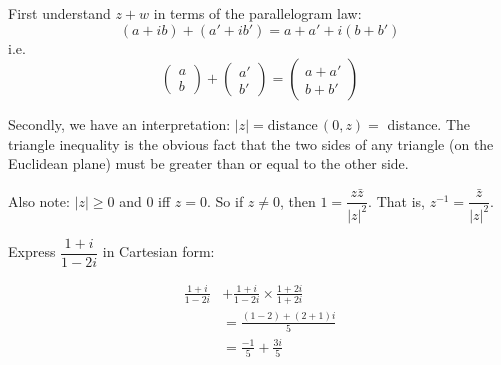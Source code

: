 \documentclass[twoside]{scrartcl}
\begin{document}
 First understand $z + w$ in terms of the parallelogram law: 
\[(a+ ib) + (a' + ib') = a + a' + i(b + b')\]
i.e. 
\[\begin{pmatrix}
a \\ b	
\end{pmatrix}
+ \begin{pmatrix}
 a' \\ b'	
 \end{pmatrix}
= \begin{pmatrix}
 a + a'\\ b + b'	
 \end{pmatrix}
\]


\begin{center}
\end{center}

Secondly, we have an interpretation: $|z| = \text{distance}\,(0,z) = $ distance. The triangle inequality is the obvious fact that the two sides of any triangle (on the Euclidean plane) must be greater than or equal to the other side. 

Also note: $|z| \geq 0$ and $0$ iff $z = 0$. So if $z \neq 0$, then $1 = \dfrac{z\bar{z}}{|z|^2}$. That is, $z^{-1} = \dfrac{\bar{z}}{|z|^2}$.\\ 


\begin{example}
	Express $\dfrac{1 +i}{1 - 2i}$ in Cartesian form:
	
	\[
\begin{aligned}
  \frac{1+i}{1-2i} &+ \frac{1 +i}{1 - 2i} \times \frac{1 + 2i}{1 + 2i}\\
  &= \frac{(1-2) + (2 + 1)i}{5}\\[0.2cm]
  &= \frac{-1}{5} + \frac{3i}{5}
\end{aligned}
\]

\end{example}
\end{document}
